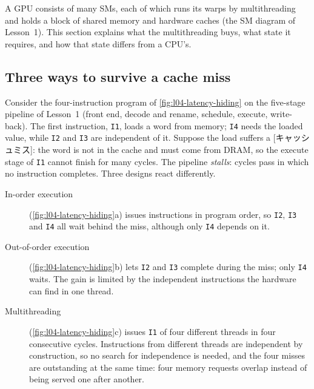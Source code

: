 \documentclass[../main.tex]{subfiles}
\begin{document}
A GPU consists of many SMs, each of which runs its warps by
multithreading and holds a block of shared memory and hardware caches
(the SM diagram of Lesson~1).  This section explains
what the multithreading buys, what state it requires, and how that
state differs from a CPU's.

\subsection{Three ways to survive a cache miss}

Consider the four-instruction program of \cref{fig:l04-latency-hiding}
on the five-stage pipeline of Lesson~1 (front end, decode and rename,
schedule, execute, write-back).  The first instruction, \texttt{I1},
loads a word from memory; \texttt{I4} needs the loaded value, while
\texttt{I2} and \texttt{I3} are independent of it.  Suppose the load
suffers a [キャッシュミス]: the word is not in the
cache and must come from DRAM, so the execute stage of \texttt{I1}
cannot finish for many cycles.  The pipeline \emph{stalls}: cycles pass in which
no instruction completes.  Three designs react differently.
\begin{description}
  \item[In-order execution] (\cref{fig:l04-latency-hiding}a) issues
    instructions in program order, so \texttt{I2}, \texttt{I3} and
    \texttt{I4} all wait behind the miss, although only \texttt{I4}
    depends on it.
  \item[Out-of-order execution] (\cref{fig:l04-latency-hiding}b) lets
    \texttt{I2} and \texttt{I3} complete during the miss; only
    \texttt{I4} waits.  The gain is limited by the independent
    instructions the hardware can find in one thread.
  \item[Multithreading] (\cref{fig:l04-latency-hiding}c) issues
    \texttt{I1} of four different threads in four consecutive cycles.
    Instructions from different threads are independent by
    construction, so no search for independence is needed, and the four
    misses are outstanding at the same time: four memory requests
    overlap instead of being served one after another.
\end{description}
\end{document}
